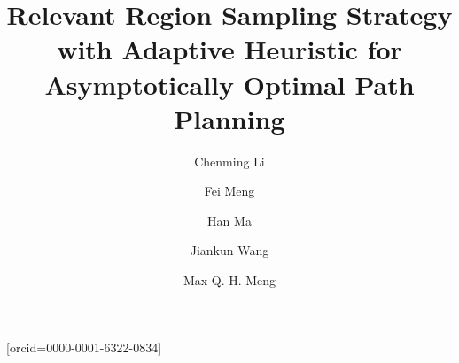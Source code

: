 \documentclass[a4paper,fleqn]{cas-dc}
\begin{document}
\let\WriteBookmarks\relax
\def\floatpagepagefraction{1}
\def\textpagefraction{.001}

\title [mode = title]{Relevant Region Sampling Strategy with Adaptive Heuristic for Asymptotically Optimal Path Planning
}             

\address[1]{Department of Electronic Engineering, The Chinese University of Hong Kong, Shatin N.T., Hong Kong SAR, China}
\address[2]{Department of Electronic and Electrical Engineering, Southern University of Science and Technology, Shenzhen, China}
\address[3]{Shenzhen Research Institute of the Chinese University of Hong Kong, Shenzhen, China}

\author[1]{Chenming Li}[orcid=0000-0001-6322-0834]

\author[1]{Fei Meng}

\author[1]{Han Ma}

\author[2]{Jiankun Wang}

\author[1,2,3]{Max Q.-H. Meng}

  
\end{document}
